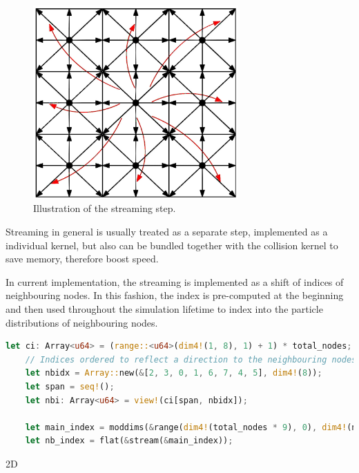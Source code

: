 \begin{figure}[!ht]
	\centering
	\includegraphics[width=0.7\textwidth]{figures/streaming.jpg}
	\caption{Illustration of the streaming step.}
	\label{fig:streaming}
\end{figure}

Streaming in general is usually treated as a separate step, implemented as a individual kernel, but also can be bundled together with the collision kernel to save memory, therefore boost speed.

In current implementation, the streaming is implemented as a shift of indices of neighbouring nodes. In this fashion, the index is pre-computed at the beginning and then used throughout the simulation lifetime to index into the particle distributions of neighbouring nodes.

\begin{lstlisting}[language=Rust, caption=Pre-computed streaming step in the way of shifting indices during the program intialization phase., label=rust-nb-index]
	let ci: Array<u64> = (range::<u64>(dim4!(1, 8), 1) + 1) * total_nodes;
	// Indices ordered to reflect a direction to the neighbouring nodes
	let nbidx = Array::new(&[2, 3, 0, 1, 6, 7, 4, 5], dim4!(8));
	let span = seq!();
	let nbi: Array<u64> = view!(ci[span, nbidx]);
	
	let main_index = moddims(&range(dim4!(total_nodes * 9), 0), dim4!(nx, ny, 9));
	let nb_index = flat(&stream(&main_index));
\end{lstlisting}

2D \\

